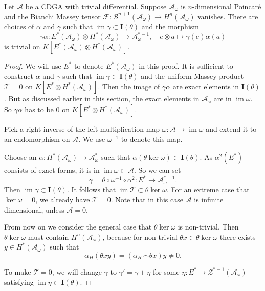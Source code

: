 \documentclass[10pt,a4paper]{amsart}
\DeclareMathOperator{\im}{im}
\begin{document}
\begin{lem}\label{vanishing uniform massey}
Let $\mathcal{A}$ be a CDGA with trivial differential. Suppose $\mathcal{A}_{\omega}$ is $n$-dimensional Poincar\'e and the Bianchi Massey tensor $\mathcal{F}:\mathcal{B}^{n+1}(\mathcal{A}_{\omega})\to H^n(\mathcal{A}_{\omega})$ vanishes. There are choices of $\alpha$ and $\gamma$ such that $\im\gamma\subset \mathbf{I}(\theta)$ and the morphism
$$
\gamma\alpha: E^*(\mathcal{A}_{\omega})\otimes H^*(\mathcal{A}_{\omega})\to \mathcal{A}_{\omega}^{*-1},\quad e\otimes a\mapsto \gamma(e)\alpha(a)
$$
is trivial on $K[E^*(\mathcal{A}_{\omega})\otimes H^*(\mathcal{A}_{\omega})]$.
\end{lem}

\begin{proof}
We will use $E^*$ to denote $E^*(\mathcal{A}_{\omega})$ in this proof. It is sufficient to construct $\alpha$ and $\gamma$ such that $\im\gamma\subset \mathbf{I}(\theta)$ and the uniform Massey product $\mathcal{T}=0$ on $K[E^*\otimes H^*(\mathcal{A}_{\omega})]$. Then the image of $\gamma\alpha$ are exact elements in $\mathbf{I}(\theta)$. But as discussed earlier in this section, the exact elements in $\mathcal{A}_{\omega}$ are in $\im\omega$. So $\gamma\alpha$ has to be 0 on $K[E^*\otimes H^*(\mathcal{A}_{\omega})]$.

Pick a right inverse of the left multiplication map $\omega:\mathcal{A}\to\im\omega$ and extend it to an endomorphism on $\mathcal{A}$. We use $\omega^{-1}$ to denote this map.

Choose an $\alpha:H^*(\mathcal{A}_{\omega})\to \mathcal{A}_{\omega}^*$ such that $\alpha(\theta\ker\omega)\subset\mathbf{I}(\theta)$. As $\alpha^2(E^*)$ consists of exact forms, it is in $\im\omega\subset\mathcal{A}$. So we can set
$$
\gamma=\theta\circ\omega^{-1}\circ\alpha^2:E^*\to \mathcal{A}_{\omega}^{*-1}.
$$
Then $\im\gamma\subset \mathbf{I}(\theta)$. It follows that $\im\mathcal{T}\subset\theta\ker\omega$. For an extreme case that $\ker\omega=0$, we already have $\mathcal{T}=0$. Note that in this case $\mathcal{A}$ is infinite dimensional, unless $\mathcal{A}=0$.

From now on we consider the general case that $\theta\ker\omega$ is non-trivial. Then $\theta\ker\omega$ must contain $H^n(\mathcal{A}_{\omega})$, because for non-trivial $\theta x\in\theta\ker\omega$ there exists $y\in H^*(\mathcal{A}_{\omega})$ such that
$$
\alpha_H(\theta xy)=(\alpha_H\frown \theta x)y\neq 0.
$$

To make $\mathcal{T}=0$, we will change $\gamma$ to $\gamma'=\gamma+\eta$ for some $\eta:E^*\to \mathcal{Z}^{*-1}(\mathcal{A}_{\omega})$ satisfying $\im\eta\subset \mathbf{I}(\theta)$.


\end{proof}
\end{document}
